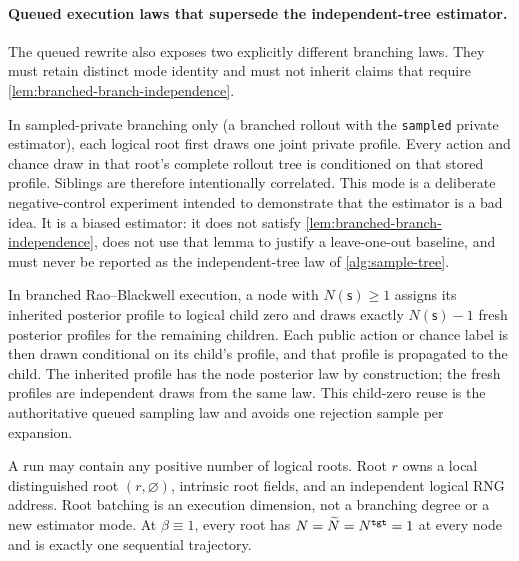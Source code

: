 \documentclass[12pt, a4paper]{article}
\begin{document}
\paragraph{Queued execution laws that supersede the independent-tree estimator.}
The queued rewrite also exposes two explicitly different branching laws. They
must retain distinct mode identity and must not inherit claims that require
\autoref{lem:branched-branch-independence}.

In sampled-private branching only (a branched rollout with the
\texttt{sampled} private estimator), each logical root first draws one joint
private profile. Every action and chance draw in that root's complete rollout
tree is conditioned on that stored profile. Siblings are therefore
intentionally correlated. This mode is a deliberate negative-control
experiment intended to demonstrate that the estimator is a bad idea. It is a
biased estimator: it does not satisfy
\autoref{lem:branched-branch-independence}, does not use that lemma to justify a
leave-one-out baseline, and must never be reported as the independent-tree law
of \cref{alg:sample-tree}.

In branched Rao--Blackwell execution, a node with $N(\mathsf s)\geq1$ assigns
its inherited posterior profile to logical child zero and draws exactly
$N(\mathsf s)-1$ fresh posterior profiles for the remaining children. Each
public action or chance label is then drawn conditional on its child's
profile, and that profile is propagated to the child. The inherited profile
has the node posterior law by construction; the fresh profiles are
independent draws from the same law. This child-zero reuse is the authoritative
queued sampling law and avoids one rejection sample per expansion.

A run may contain any positive number of logical roots. Root $r$ owns a local
distinguished root $(r,\varnothing)$, intrinsic root fields, and an independent
logical RNG address. Root batching is an execution dimension, not a branching
degree or a new estimator mode. At $\beta\equiv1$, every root has
$N=\widetilde N=N^{\tt tgt}=1$ at every node and is exactly one sequential
trajectory.
\end{document}
